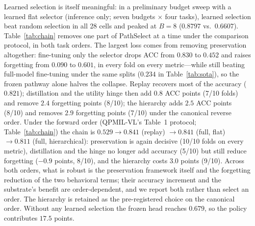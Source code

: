 \documentclass{article}
\begin{document}
Learned selection is itself meaningful: in a preliminary budget sweep with a learned flat selector (inference only; seven budgets $\times$ four tasks), learned selection beat random selection in all 28 cells and peaked at $B=8$ ($0.8797$ vs.\ $0.6607$).
Table~\ref{tab:chain} removes one part of PathSelect at a time under the comparison protocol, in both task orders.
The largest loss comes from removing preservation altogether: fine-tuning only the selector drops ACC from $0.830$ to $0.452$ and raises forgetting from $0.090$ to $0.601$, in every fold on every metric---while still beating full-model fine-tuning under the same splits ($0.234$ in Table~\ref{tab:sota}), so the frozen pathway alone halves the collapse.
Replay recovers most of the accuracy ($0.821$); distillation and the utility hinge then add $0.8$ ACC points (7/10 folds) and remove $2.4$ forgetting points (8/10); the hierarchy adds $2.5$ ACC points (8/10) and removes $2.9$ forgetting points (7/10) under the canonical reverse order. Under the forward order (QPMIL-VL's Table~1 protocol; Table~\ref{tab:chain}) the chain is $0.529\rightarrow0.841$ (replay) $\rightarrow0.841$ (full, flat) $\rightarrow0.811$ (full, hierarchical): preservation is again decisive (10/10 folds on every metric), distillation and the hinge no longer add accuracy (5/10) but still reduce forgetting ($-0.9$ points, 8/10), and the hierarchy costs $3.0$ points (9/10). Across both orders, what is robust is the preservation framework itself and the forgetting reduction of the two behavioral terms; their accuracy increment and the substrate's benefit are order-dependent, and we report both rather than select an order. The hierarchy is retained as the pre-registered choice on the canonical order.
Without any learned selection the frozen head reaches $0.679$, so the policy contributes $17.5$ points.
\end{document}
